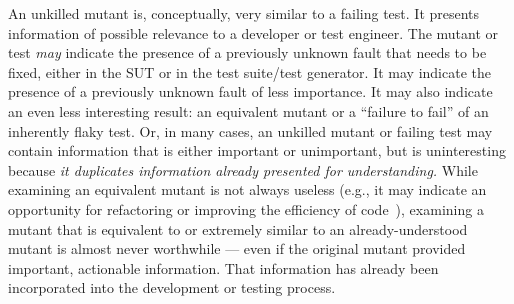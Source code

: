 An unkilled mutant is, conceptually, very similar to a failing test.
It presents information of possible relevance to a developer or test
engineer.  The mutant or test \emph{may} indicate the presence of a
previously unknown fault that needs to be fixed, either in the SUT or in the test suite/test
generator.  It may indicate the presence of a previously unknown fault
of less importance.  It may also indicate an even less interesting
result:  an equivalent mutant or 
a ``failure to fail'' of an inherently flaky test.  Or, in many cases, an unkilled
mutant or failing test may contain information that is either
important or unimportant, but is uninteresting because \emph{it
  duplicates information already presented for understanding.}  While
examining an equivalent mutant is not always useless (e.g., it may indicate
an opportunity for refactoring or improving the efficiency of code~\cite{ivankovic2018industrial,groce2018verified}), examining a mutant that is
equivalent to or extremely similar to an already-understood mutant is almost never
worthwhile --- even if the original mutant provided important,
actionable information.  That information has already been
incorporated into the development or testing process.

